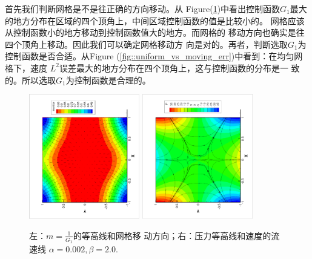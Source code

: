           首先我们判断网格是不是往正确的方向移动。从
          Figure(\ref{fig::mesh_move_direction})中看出控制函数$G_1$最大
          的地方分布在区域的四个顶角上，中间区域控制函数的值是比较小的。
          网格应该从控制函数小的地方移动到控制函数值大的地方。而网格的
          移动方向也确实是往四个顶角上移动。因此我们可以确定网格移动方
          向是对的。再者，判断选取$G_1$为控制函数是否合适。从Figure
          (\ref{fig::uniform_vs_moving_err})中看到：在均匀网格下，速度
          $L^2$误差最大的地方分布在四个顶角上，这与控制函数的分布是一
          致的。所以选取$G_1$为控制函数是合理的。
          \begin{figure}[ht]
            \begin{center}
              \includegraphics[width = 0.43\textwidth, angle = -90]{picture/first/collidingFlow/mesh_move_direction.eps}
              \includegraphics[width = 0.43\textwidth, angle = -90]{picture/first/collidingFlow/pressure_contour.eps}
              \caption{\small 左：$m = \frac{1}{G_1}$的等高线和网格移
                动方向；右：压力等高线和速度的流速线 $\alpha = 0.002, \beta = 2.0$.}
              \label{fig::mesh_move_direction}
            \end{center}
          \end{figure}

